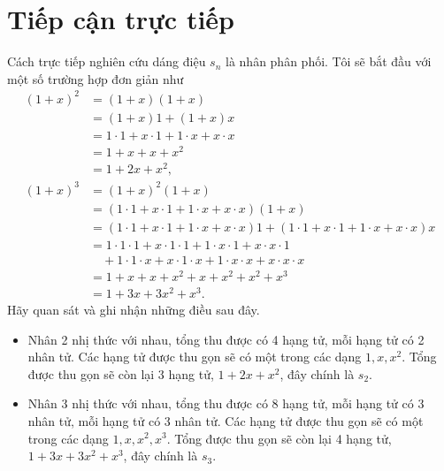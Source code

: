 \documentclass[12pt]{article} %
\begin{document}
\section{Tiếp cận trực tiếp}
Cách trực tiếp nghiên cứu dáng điệu \(s_n\) là nhân phân phối. Tôi sẽ bắt đầu với một số trường hợp đơn giản như 
\begin{align*}
    (1+x)^2
        & = (1+x)(1+x) \\
        & = (1+x)1 + (1+x)x \\
        & = 1 \cdot 1 + x \cdot 1 + 1 \cdot x + x \cdot x \\
        & = 1 + x + x +x^2 \\
        & = 1 + 2x + x^2, \\
    (1+x)^3 
        & = (1+x)^2(1+x) \\
        & = (1 \cdot 1 + x \cdot 1 + 1 \cdot x + x \cdot x)(1+x) \\
        & = (1 \cdot 1 + x \cdot 1 + 1 \cdot x + x \cdot x) 1 + (1 \cdot 1 + x \cdot 1 + 1 \cdot x + x \cdot x) x \\
        & = 1 \cdot 1 \cdot 1 + x \cdot 1 \cdot 1 + 1 \cdot x \cdot 1 + x \cdot x \cdot 1 \\
        & \quad + 1 \cdot 1 \cdot x + x \cdot 1 \cdot x + 1 \cdot x \cdot x + x \cdot x \cdot x \\
        & = 1 + x + x + x^2 + x + x^2 + x^2 + x^3 \\
        & = 1 + 3x + 3x^2 + x^3.
\end{align*}
Hãy quan sát và ghi nhận những điều sau đây.
\begin{itemize}
    \item Nhân 2 nhị thức với nhau, tổng thu được có 4 hạng tử, mỗi hạng tử có 2 nhân tử. Các hạng tử được thu gọn sẽ có một trong các dạng \(1, x, x^2\). Tổng được thu gọn sẽ còn lại 3 hạng tử, \(1+2x+x^2\), đây chính là \(s_2\).        
    \item Nhân 3 nhị thức với nhau, tổng thu được có 8 hạng tử, mỗi hạng tử có 3 nhân tử, mỗi hạng tử có 3 nhân tử. Các hạng tử được thu gọn sẽ có một trong các dạng \(1, x, x^2, x^3\). Tổng được thu gọn sẽ còn lại 4 hạng tử, \(1+3x+3x^2+x^3\), đây chính là \(s_3\).
\end{itemize} 
\end{document}
